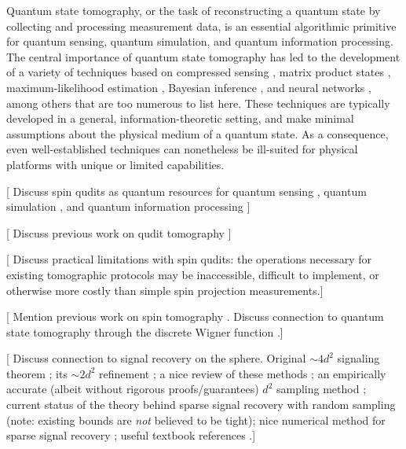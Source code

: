 \documentclass[nofootinbib,notitlepage,twocolumn]{revtex4-2}
\newcommand{\1}{\mathds{1}}
\newcommand{\red}[1]{{\color{red} #1}}
\begin{document}
Quantum state tomography, or the task of reconstructing a quantum state by collecting and processing measurement data, is an essential algorithmic primitive for quantum sensing, quantum simulation, and quantum information processing.
The central importance of quantum state tomography has led to the development of a variety of techniques based on compressed sensing \cite{gross2010quantum}, matrix product states \cite{cramer2010efficient}, %
maximum-likelihood estimation \cite{smolin2012efficient}, %
Bayesian inference \cite{huszar2012adaptive}, and neural networks \cite{torlai2018neuralnetwork}, among others that are too numerous to list here.
These techniques are typically developed in a general, information-theoretic setting, and make minimal assumptions about the physical medium of a quantum state.
As a consequence, even well-established techniques can nonetheless be ill-suited for physical platforms with unique or limited capabilities.

[\red{Discuss spin qudits as quantum resources for quantum sensing \cite{stefano2019set}, quantum simulation \cite{banerjee2013atomic, cazalilla2014ultracold, rico2018nuclear}, and quantum information processing \cite{albert2020robust, gross2020encoding}}]

[\red{Discuss previous work on qudit tomography \cite{thew2002qudit, flammia2005minimal, salazar2012quantum, sosa-martinez2017quantum, ha2018minimal, evrard2019enhanced, stefano2019set, palici2020oam}}]

[\red{Discuss practical limitations with spin qudits: the operations necessary for existing tomographic protocols may be inaccessible, difficult to implement, or otherwise more costly than simple spin projection measurements.}]

[\red{Mention previous work on spin tomography \cite{manko1997spin}.  Discuss connection to quantum state tomography through the discrete Wigner function \cite{leonhardt1995quantumstate, leonhardt1996discrete}.}]

[\red{Discuss connection to signal recovery on the sphere.  Original $\sim4d^2$ signaling theorem \cite{driscoll1994computing}; its $\sim2d^2$ refinement \cite{mcewen2011novel}; a nice review of these methods \cite{mcewen2011sampling}; an empirically accurate (albeit without rigorous proofs/guarantees) $d^2$ sampling method \cite{khalid2014optimaldimensionality}; current status of the theory behind sparse signal recovery with random sampling \cite{rauhut2011sparse} (note: existing bounds are {\it not} believed to be tight); nice numerical method for sparse signal recovery \cite{alem2012sparse}; useful textbook references \cite{freeden2008spherical, freeden2018spherical}.}]
\end{document}
